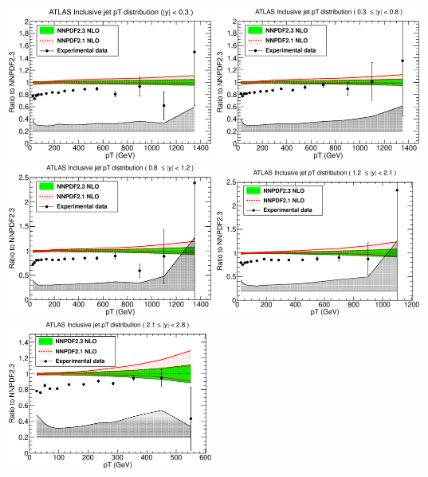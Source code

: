 \begin{figure}[hp]
\centering
\includegraphics[width=0.48\textwidth]{6-LHCimpact/figs/ATLASR04JETS36PB_0.eps}
\includegraphics[width=0.48\textwidth]{6-LHCimpact/figs/ATLASR04JETS36PB_1.eps}
\includegraphics[width=0.48\textwidth]{6-LHCimpact/figs/ATLASR04JETS36PB_2.eps}
\includegraphics[width=0.48\textwidth]{6-LHCimpact/figs/ATLASR04JETS36PB_3.eps}
\includegraphics[width=0.48\textwidth]{6-LHCimpact/figs/ATLASR04JETS36PB_4.eps}

\end{figure}
